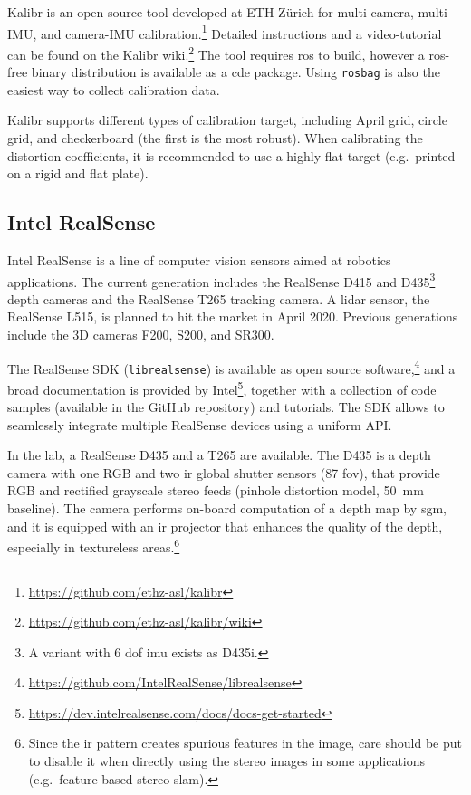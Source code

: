 \documentclass[11pt, letterpaper, twoside]{article}
\begin{document}
Kalibr is an open source tool developed at ETH Zürich for multi-camera,
multi-IMU, and camera-IMU
calibration.\footnote{\label{note:kalibr}\url{https://github.com/ethz-asl/kalibr}} Detailed
instructions and a video-tutorial can be found on the Kalibr
wiki.\footnote{\url{https://github.com/ethz-asl/kalibr/wiki}} The tool requires
\gls{ros} to build, however a \gls{ros}-free binary distribution is available
as a \gls{cde} package. Using \texttt{rosbag} is also the easiest way to
collect calibration data.

Kalibr supports different types of calibration target, including April grid,
circle grid, and checkerboard (the first is the most robust). When calibrating
the distortion coefficients, it is recommended to use a highly flat target
(e.g.\ printed on a rigid and flat plate).

\subsection{Intel RealSense}\label{sec:realsense}

Intel RealSense is a line of computer vision sensors aimed at robotics
applications. The current generation includes the RealSense D415 and
D435\footnote{A variant with 6 \gls{dof} \gls{imu} exists as D435i.} depth
cameras and the RealSense T265 tracking camera. A lidar sensor, the RealSense
L515, is planned to hit the market in April 2020. Previous generations include
the 3D cameras F200, S200, and SR300.

The RealSense SDK (\texttt{librealsense}) is available as open source
software,\footnote{\url{https://github.com/IntelRealSense/librealsense}} and a
broad documentation is provided by
Intel\footnote{\url{https://dev.intelrealsense.com/docs/docs-get-started}},
together with a collection of code samples (available in the GitHub repository)
and tutorials. The SDK allows to seamlessly integrate multiple RealSense
devices using a uniform API.

In the lab, a RealSense D435 and a T265 are available. The D435 is a depth
camera with one RGB and two \gls{ir} global shutter sensors (87\textdegree{}
\gls{fov}), that provide RGB and rectified grayscale stereo feeds (pinhole
distortion model, 50~mm baseline). The camera performs on-board computation of a
depth map by \gls{sgm}, and it is equipped with an \gls{ir} projector that
enhances the quality of the depth, especially in textureless
areas.\footnote{Since the \gls{ir} pattern creates spurious features in the
    image, care should be put to disable it when directly using the stereo
    images in some applications (e.g.\ feature-based stereo \gls{slam}).}
\end{document}
